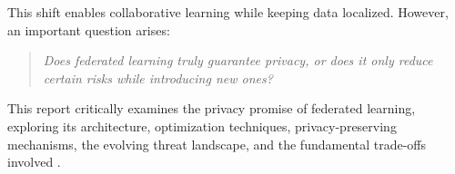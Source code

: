 This shift enables collaborative learning while keeping data localized. However, an important question arises:

\begin{quote}
\textit{Does federated learning truly guarantee privacy, or does it only reduce certain risks while introducing new ones?}
\end{quote}

This report critically examines the privacy promise of federated learning, exploring its architecture, optimization techniques, privacy-preserving mechanisms, the evolving threat landscape, and the fundamental trade-offs involved \cite{mcmahan2017communication, zhang2021survey}.
